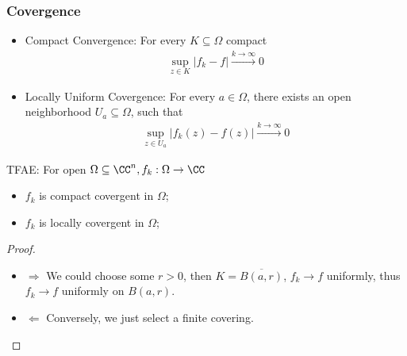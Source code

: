 \documentclass[Total.tex]{subfiles}
\begin{document}
				\subsubsection{Covergence}
					\begin{Def}
						\begin{itemize}
							\item Compact Convergence: For every $K\subseteq \Omega$ compact
							\begin{gather*}
								\sup_{z\in K} |f_k-f|\stackrel{k\rightarrow\infty}{\rightarrow} 0
							\end{gather*}
							
							\item Locally Uniform Covergence: For every $a\in \Omega$, there exists an open neighborhood $U_a\subseteq \Omega$, such that
							\begin{gather*}
								\sup_{z\in U_a} |f_k(z)-f(z)|\stackrel{k\rightarrow \infty}{\rightarrow} 0
							\end{gather*}
						\end{itemize}
					\end{Def}
					
					\begin{lemma}
						TFAE: For open $\Omega\subseteq \CC^n,f_k:\Omega\rightarrow \CC$
						\begin{itemize}
							\item $f_k$ is compact covergent in $\Omega$;
							\item $f_k$ is locally covergent in $\Omega$;
						\end{itemize}
					\end{lemma}
					\begin{proof}
						\begin{itemize}
							\item $\Rightarrow$ We could choose some $r>0$, then $K=\overline{B(a,r)}$, $f_k\rightarrow f$ uniformly, thus $f_k\rightarrow f$ uniformly on $B(a,r)$. 
							
							\item $\Leftarrow$ Conversely, we just select a finite covering.
						\end{itemize}
					\end{proof}
					
\end{document}
